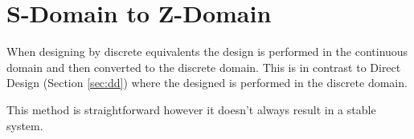 \documentclass{article}
\newcommand{\sincludepdf}[2][]{
	
}
\begin{document}
\section{S-Domain to Z-Domain}

When designing by discrete equivalents the design is performed
in the continuous domain and then converted to the discrete domain.
This is in contrast to Direct Design (Section \ref{sec:dd}) where
the designed is performed in the discrete domain.

This method is straightforward however it doesn't always result in
a stable system.

\sincludepdf[pages={10},
		pagecommand=\subsection{Mapping: $z=e^{sT}$}\label{sec:mapzest}\subsubsection*{Example 1}
		]{scan/11221301.pdf}

\sincludepdf[pages={1},
			pagecommand=\subsubsection*{Example 2}
	]{scan/11231301.pdf}

\sincludepdf[pages={9},
			pagecommand=\subsection{Mapping: Forward, Backward, Trapezoid}\subsubsection*{Example 1}
	]{scan/11211301.pdf}

\sincludepdf[pages={10},
			pagecommand=\subsubsection*{Example 2}
	]{scan/11211301.pdf}

\sincludepdf[pages={8},
			pagecommand=\subsubsection*{Example 3}
		]{scan/11221301.pdf}
\end{document}
